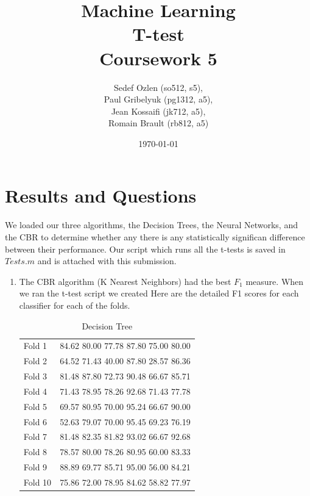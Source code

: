 \documentclass[a4paper,12pt,oneside,final]{report}
\author{
    Sedef Ozlen (so512, s5), \\ 
    Paul Gribelyuk (pg1312, a5), \\
    Jean Kossaifi (jk712, a5), \\ 
    Romain Brault (rb812, a5)
}
\title{\Huge Machine Learning \\ T-test \\ Coursework 5}
\date{\today}
\begin{document}
\maketitle
\tableofcontents
\listoffigures


\chapter{Results and Questions}
We loaded our three algorithms, the Decision Trees, the Neural Networks, and the CBR to determine whether any there is any statistically significan difference between their performance.  Our script which runs all the t-tests is saved in $Tests.m$ and is attached with this submission.
\begin{enumerate}
\item The CBR algorithm (K Nearest Neighbors) had the best $F_1$ measure.  When we ran the t-test script we created
Here are the detailed F1 scores for each classifier for each of the folds.


\begin{table} [H]
\begin{tabular}{ll}
Fold 1 &  84.62  80.00  77.78  87.80  75.00  80.00    \\ 
Fold 2 &  64.52  71.43  40.00  87.80  28.57  86.36    \\ 
Fold 3 &  81.48  87.80  72.73  90.48  66.67  85.71   \\ 
Fold 4 &  71.43  78.95  78.26  92.68  71.43  77.78   \\ 
Fold 5 &  69.57  80.95  70.00  95.24  66.67  90.00   \\ 
Fold 6 &  52.63  79.07  70.00  95.45  69.23  76.19   \\ 
Fold 7 &  81.48  82.35  81.82  93.02  66.67  92.68   \\ 
Fold 8 &  78.57  80.00  78.26  80.95  60.00  83.33  \\ 
Fold 9 &  88.89  69.77  85.71  95.00  56.00  84.21   \\ 
Fold 10 &  75.86  72.00  78.95  84.62  58.82  77.97   \\ 
\end{tabular}
\caption{ Decision Tree  }
\end{table}



\end{enumerate}
\end{document}
